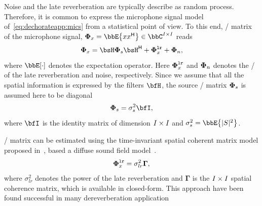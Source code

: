 \mynewline
Noise and the late reverberation are typically describe as random process.
Therefore, it is common to express the microphone signal model of~\cref{eq:dechorateapp:mics} from a statistical point of view.
To this end, \xPSD/ matrix of the microphone signal, $\xpsd_{\mic} = \bbE\kbrace{\mic \khermitian{\mic}} \in \bbC^{\numMics \times \numMics}$ reads
\begin{equation}
    \xpsd_{\mic} = \FLTS \xpsd_{\src} \khermitian{\FLTS} + \xpsd^{\mathtt{lr}}_{\mic} + \xpsd_{\nse}
    ,
\end{equation}
where $\bbE[\cdot]$ denotes the expectation operator.
Here $\boldsymbol{\Phi}^{\mathtt{lr}}_{x}$ and $\boldsymbol{\Phi}_{n}$ denotes the \xPSD/ of the late reverberation and noise, respectively.
Since we assume that all the spatial information is expressed by the filters $\FLTSS$, the source \xPSD/ matrix $\boldsymbol{\Phi}_{s}$ is assumed here to be diagonal
\begin{equation}
    \xpsd_\src = \sigma_\src^2 \bfI
    ,
\end{equation}
where $\bfI$ is the identity matrix of dimension $I \times I$ and $\sigma_\src^2 = \bbE\kbrace{\powerOf{\SRC}}$.

 \xPSD/ matrix can be estimated using the time-invariant spatial coherent matrix model proposed in~, based a diffuse sound field model~.
\begin{equation}
    \boldsymbol{\Phi}^{\mathtt{lr}}_{x} = \sigma_{lr}^2\mathbf{\Gamma}
    ,
\end{equation}
where $\sigma_{lr}^2$ denotes the power of the late reverberation and $\mathbf{\Gamma}$ is the $I \times I$ spatial coherence matrix, which is available in closed-form.
This approach have been found successful in many dereverberation application~

